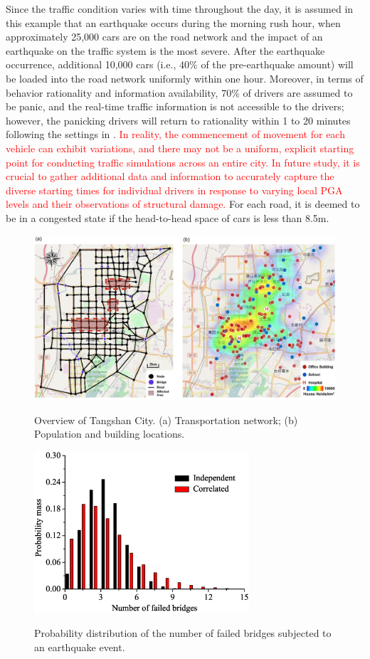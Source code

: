 \documentclass[review,11pt,nonatbib]{elsarticle}
\begin{document}
\par Since the traffic condition varies with time throughout the day, it is assumed in this example that an earthquake occurs during the morning rush hour, when approximately 25,000 cars are on the road network and the impact of an earthquake on the traffic system is the most severe. After the earthquake occurrence, additional 10,000 cars (i.e., $40\%$ of the pre-earthquake amount) will be loaded into the road network uniformly within one hour. Moreover, in terms of behavior rationality and information availability,  70\% of drivers are assumed to be panic, and the real-time traffic information is not accessible to the drivers; however, the panicking drivers will return to rationality within 1 to 20 minutes following the settings in \citep{feng2017post}. \textcolor{red}{  In reality, the commencement of movement for each vehicle can exhibit variations, and there may not be a uniform, explicit starting point for conducting traffic simulations across an entire city. In future study, it is crucial to gather additional data and information to accurately capture the diverse starting times for individual drivers in response to varying local PGA levels and their observations of structural damage.} For each road, it is deemed to be in a congested state if the head-to-head space of cars is less than 8.5m.  

\begin{figure}[!htp]\center
\includegraphics[width=12cm]{fig1.pdf}\\
\caption{Overview of Tangshan City. (a) Transportation network; (b) Population and building locations.}\label{fig1}
\end{figure}

\begin{figure}[!htp]\center
\includegraphics[width=8cm]{fig2.eps}\\
\caption{Probability distribution of the number of failed bridges subjected to an earthquake event.}\label{fig2}
\end{figure}
\end{document}
